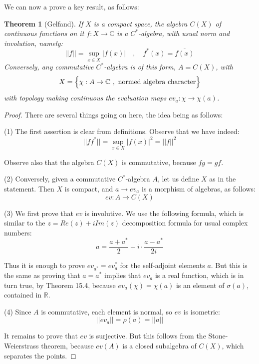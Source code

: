 \documentclass[12pt]{amsbook}
\newtheorem{theorem}{Theorem}[chapter]
\begin{document}
We can now a prove a key result, as follows:


\begin{theorem}[Gelfand]
If $X$ is a compact space,  the algebra $C(X)$ of continuous functions on it $f:X\to\mathbb C$ is a $C^*$-algebra, with usual norm and involution, namely:
$$||f||=\sup_{x\in X}|f(x)|\quad,\quad 
f^*(x)=\overline{f(x)}$$
Conversely, any commutative $C^*$-algebra is of this form, $A=C(X)$, with 
$$X=\Big\{\chi:A\to\mathbb C\ ,\ {\rm normed\ algebra\ character}\Big\}$$
with topology making continuous the evaluation maps $ev_a:\chi\to\chi(a)$.
\end{theorem}

\begin{proof}
There are several things going on here, the idea being as follows:

\medskip

(1) The first assertion is clear from definitions. Observe that we have indeed:
$$||ff^*||
=\sup_{x\in X}|f(x)|^2
=||f||^2$$

Observe also that the algebra $C(X)$ is commutative, because $fg=gf$.

\medskip

(2) Conversely, given a commutative $C^*$-algebra $A$, let us define $X$ as in the statement. Then $X$ is compact, and $a\to ev_a$ is a morphism of algebras, as follows:
$$ev:A\to C(X)$$

(3) We first prove that $ev$ is involutive. We use the following formula, which is similar to the $z=Re(z)+iIm(z)$ decomposition formula for usual complex numbers:
$$a=\frac{a+a^*}{2}+i\cdot\frac{a-a^*}{2i}$$

Thus it is enough to prove $ev_{a^*}=ev_a^*$ for the self-adjoint elements $a$. But this is the same as proving that $a=a^*$ implies that $ev_a$ is a real function, which is in turn true, by Theorem 15.4, because $ev_a(\chi)=\chi(a)$ is an element of $\sigma(a)$, contained in $\mathbb R$.

\medskip

(4) Since $A$ is commutative, each element is normal, so $ev$ is isometric:
$$||ev_a||
=\rho(a)
=||a||$$

It remains to prove that $ev$ is surjective. But this follows from the Stone-Weierstrass theorem, because $ev(A)$ is a closed subalgebra of $C(X)$, which separates the points.
\end{proof}
\end{document}
